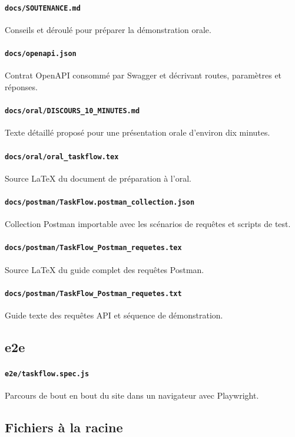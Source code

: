\documentclass[10pt,a4paper]{article}
\begin{document}
\paragraph{\texttt{docs/SOUTENANCE.md}} Conseils et déroulé pour préparer la démonstration orale.
\paragraph{\texttt{docs/openapi.json}} Contrat OpenAPI consommé par Swagger et décrivant routes, paramètres et réponses.
\paragraph{\texttt{docs/oral/DISCOURS\_10\_MINUTES.md}} Texte détaillé proposé pour une présentation orale d'environ dix minutes.
\paragraph{\texttt{docs/oral/oral\_taskflow.tex}} Source LaTeX du document de préparation à l'oral.
\paragraph{\texttt{docs/postman/TaskFlow.postman\_collection.json}} Collection Postman importable avec les scénarios de requêtes et scripts de test.
\paragraph{\texttt{docs/postman/TaskFlow\_Postman\_requetes.tex}} Source LaTeX du guide complet des requêtes Postman.
\paragraph{\texttt{docs/postman/TaskFlow\_Postman\_requetes.txt}} Guide texte des requêtes API et séquence de démonstration.
\subsection*{e2e}
\paragraph{\texttt{e2e/taskflow.spec.js}} Parcours de bout en bout du site dans un navigateur avec Playwright.
\subsection*{Fichiers à la racine}
\end{document}
